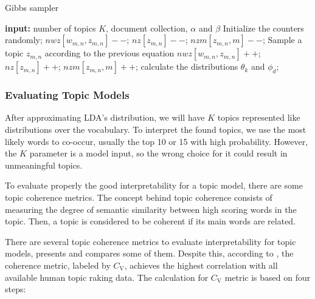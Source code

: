 	\begin{algorithm}[h!]
		\caption{Gibbs sampler} 
		\label{algo:gibbs-sampling}
		\begin{algorithmic}[1]
			\State \textbf{input:} number of topics $K$, document collection, $\alpha$ and $\beta$
			\Begin
			\State Initialize the counters randomly;
			\State $nwz[w_{m,n}, z_{m,n}]--$; $nz[z_{m,n}]--$; $nzm[z_{m,n},m]--$;
			\State Sample a topic $z_{m,n}$ according to the previous equation
			\State $nwz[w_{m,n}, z_{m,n}]++$; $nz[z_{m,n}]++$; $nzm[z_{m,n},m]++$;
			\EndFor
			\EndFor
			\State calculate the distributions $\theta_{k}$ and $\phi_{d}$;
			\EndIf
			\EndWhile
			\End
		\end{algorithmic} 
	\end{algorithm}
	
	\subsubsection{Evaluating Topic Models}
	
	After approximating LDA's distribution, we will have $K$ topics represented like distributions over the vocabulary. To interpret the found topics, we use the most likely words to co-occur, usually the top 10 or 15 with high probability. However, the $K$ parameter is a model input, so the wrong choice for it could result in unmeaningful topics. 
	
	To evaluate properly the good interpretability for a topic model, there are some topic coherence metrics. The concept behind topic coherence consists of measuring the degree of semantic similarity between high scoring words in the topic. Then, a topic is considered to be coherent if its main words are related.
	
	There are several topic coherence metrics to evaluate interpretability for topic models,  presents and compares some of them.
	Despite this, according to , the coherence metric, labeled by $C_{\text{V}}$, achieves the highest correlation with all available human topic raking data. The calculation for $C_{\text{V}}$ metric is based on four steps:
	
